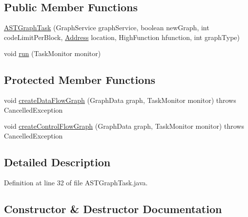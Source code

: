 \subsection*{Public Member Functions}
\begin{DoxyCompactItemize}
\item 
\mbox{\hyperlink{classghidra_1_1app_1_1plugin_1_1core_1_1decompile_1_1actions_1_1_a_s_t_graph_task_a6bdfed55abedc7f4e8e16258c4ed1650}{A\+S\+T\+Graph\+Task}} (Graph\+Service graph\+Service, boolean new\+Graph, int code\+Limit\+Per\+Block, \mbox{\hyperlink{class_address}{Address}} location, High\+Function hfunction, int graph\+Type)
\item 
void \mbox{\hyperlink{classghidra_1_1app_1_1plugin_1_1core_1_1decompile_1_1actions_1_1_a_s_t_graph_task_afed12375602467d717a1d2afe52573ee}{run}} (Task\+Monitor monitor)
\end{DoxyCompactItemize}
\subsection*{Protected Member Functions}
\begin{DoxyCompactItemize}
\item 
void \mbox{\hyperlink{classghidra_1_1app_1_1plugin_1_1core_1_1decompile_1_1actions_1_1_a_s_t_graph_task_a696b176035c13b47e77ed1371f3511f5}{create\+Data\+Flow\+Graph}} (Graph\+Data graph, Task\+Monitor monitor)  throws Cancelled\+Exception 
\item 
void \mbox{\hyperlink{classghidra_1_1app_1_1plugin_1_1core_1_1decompile_1_1actions_1_1_a_s_t_graph_task_ab294e8153df90959f5b9d7ca7bd53f26}{create\+Control\+Flow\+Graph}} (Graph\+Data graph, Task\+Monitor monitor)  throws Cancelled\+Exception 
\end{DoxyCompactItemize}


\subsection{Detailed Description}


Definition at line 32 of file A\+S\+T\+Graph\+Task.\+java.



\subsection{Constructor \& Destructor Documentation}
\mbox{\label{classghidra_1_1app_1_1plugin_1_1core_1_1decompile_1_1actions_1_1_a_s_t_graph_task_a6bdfed55abedc7f4e8e16258c4ed1650}} 
